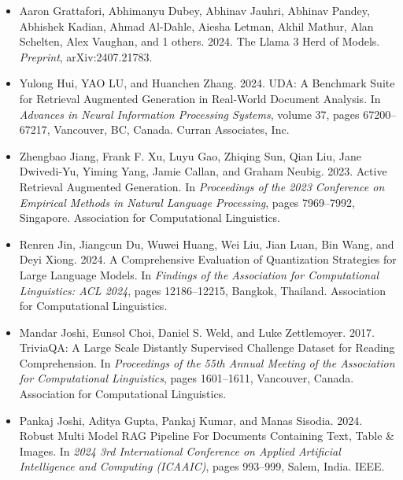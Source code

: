 \documentclass[10pt]{article}
\begin{document}
\begin{itemize}
    \item Aaron Grattafori, Abhimanyu Dubey, Abhinav Jauhri, Abhinav Pandey, Abhishek Kadian, Ahmad Al-Dahle, Aiesha Letman, Akhil Mathur, Alan Schelten, Alex Vaughan, and 1 others. 2024. The Llama 3 Herd of Models. \textit{Preprint}, arXiv:2407.21783.
    \item Yulong Hui, YAO LU, and Huanchen Zhang. 2024. UDA: A Benchmark Suite for Retrieval Augmented Generation in Real-World Document Analysis. In \textit{Advances in Neural Information Processing Systems}, volume 37, pages 67200--67217, Vancouver, BC, Canada. Curran Associates, Inc.
    \item Zhengbao Jiang, Frank F. Xu, Luyu Gao, Zhiqing Sun, Qian Liu, Jane Dwivedi-Yu, Yiming Yang, Jamie Callan, and Graham Neubig. 2023. Active Retrieval Augmented Generation. In \textit{Proceedings of the 2023 Conference on Empirical Methods in Natural Language Processing}, pages 7969--7992, Singapore. Association for Computational Linguistics.
    \item Renren Jin, Jiangcun Du, Wuwei Huang, Wei Liu, Jian Luan, Bin Wang, and Deyi Xiong. 2024. A Comprehensive Evaluation of Quantization Strategies for Large Language Models. In \textit{Findings of the Association for Computational Linguistics: ACL 2024}, pages 12186--12215, Bangkok, Thailand. Association for Computational Linguistics.
    \item Mandar Joshi, Eunsol Choi, Daniel S. Weld, and Luke Zettlemoyer. 2017. TriviaQA: A Large Scale Distantly Supervised Challenge Dataset for Reading Comprehension. In \textit{Proceedings of the 55th Annual Meeting of the Association for Computational Linguistics}, pages 1601--1611, Vancouver, Canada. Association for Computational Linguistics.
    \item Pankaj Joshi, Aditya Gupta, Pankaj Kumar, and Manas Sisodia. 2024. Robust Multi Model RAG Pipeline For Documents Containing Text, Table \& Images. In \textit{2024 3rd International Conference on Applied Artificial Intelligence and Computing (ICAAIC)}, pages 993--999, Salem, India. IEEE.
\end{itemize}
\end{document}
